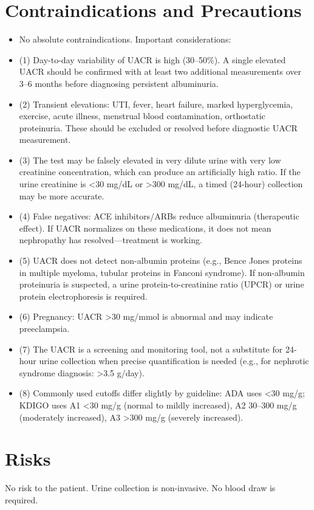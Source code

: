 \section*{Contraindications and Precautions}
\begin{itemize}
  \item No absolute contraindications. Important considerations:
  \item (1) Day-to-day variability of UACR is high (30--50\%). A single elevated UACR should be confirmed with at least two additional measurements over 3--6 months before diagnosing persistent albuminuria.
  \item (2) Transient elevations: UTI, fever, heart failure, marked hyperglycemia, exercise, acute illness, menstrual blood contamination, orthostatic proteinuria. These should be excluded or resolved before diagnostic UACR measurement.
  \item (3) The test may be falsely elevated in very dilute urine with very low creatinine concentration, which can produce an artificially high ratio. If the urine creatinine is <30 mg/dL or >300 mg/dL, a timed (24-hour) collection may be more accurate.
  \item (4) False negatives: ACE inhibitors/ARBs reduce albuminuria (therapeutic effect). If UACR normalizes on these medications, it does not mean nephropathy has resolved---treatment is working.
  \item (5) UACR does not detect non-albumin proteins (e.g., Bence Jones proteins in multiple myeloma, tubular proteins in Fanconi syndrome). If non-albumin proteinuria is suspected, a urine protein-to-creatinine ratio (UPCR) or urine protein electrophoresis is required.
  \item (6) Pregnancy: UACR >30 mg/mmol is abnormal and may indicate preeclampsia.
  \item (7) The UACR is a screening and monitoring tool, not a substitute for 24-hour urine collection when precise quantification is needed (e.g., for nephrotic syndrome diagnosis: >3.5 g/day).
  \item (8) Commonly used cutoffs differ slightly by guideline: ADA uses <30 mg/g; KDIGO uses A1 <30 mg/g (normal to mildly increased), A2 30--300 mg/g (moderately increased), A3 >300 mg/g (severely increased).
\end{itemize}
\section*{Risks}
No risk to the patient. Urine collection is non-invasive. No blood draw is required.

